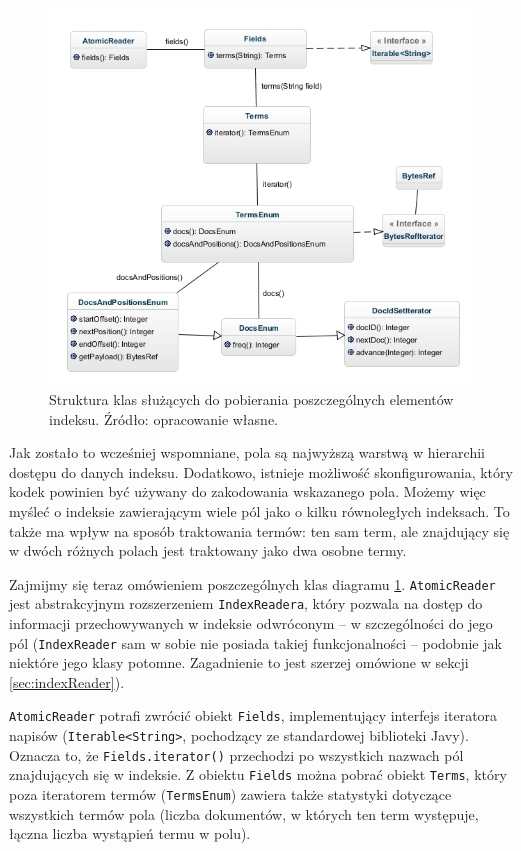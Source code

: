 \begin{figure}[here]
 \includegraphics[scale=0.64]{pictures/LuceneAccessAPI_1.jpg}
 \caption{Struktura klas służących do pobierania poszczególnych elementów indeksu. Źródło: opracowanie własne.\label{fig:indexApi}}
\end{figure}

Jak zostało to wcześniej wspomniane, pola są najwyższą warstwą w hierarchii dostępu do danych indeksu. Dodatkowo, istnieje możliwość skonfigurowania, który kodek powinien być używany do zakodowania wskazanego pola. Możemy więc myśleć o indeksie zawierającym wiele pól jako o kilku równoległych indeksach. To także ma wpływ na sposób traktowania termów: ten sam term, ale znajdujący się w dwóch różnych polach jest traktowany jako dwa osobne termy. 

Zajmijmy się teraz omówieniem poszczególnych klas diagramu \ref{fig:indexApi}. \texttt{AtomicReader} jest abstrakcyjnym rozszerzeniem \texttt{IndexReadera}, który pozwala na dostęp do informacji przechowywanych w indeksie odwróconym -- w szczególności do jego pól (\texttt{IndexReader} sam w sobie nie posiada takiej funkcjonalności -- podobnie jak niektóre jego klasy potomne. Zagadnienie to jest szerzej omówione w sekcji \ref{sec:indexReader}). 

\texttt{AtomicReader} potrafi zwrócić obiekt \texttt{Fields}, implementujący interfejs iteratora napisów (\texttt{Iterable<String>}, pochodzący ze standardowej biblioteki Javy). Oznacza to, że \texttt{Fields.iterator()} przechodzi po wszystkich nazwach pól znajdujących się w indeksie. Z obiektu \texttt{Fields} można pobrać obiekt \texttt{Terms}, który poza iteratorem termów (\texttt{TermsEnum}) zawiera także statystyki dotyczące wszystkich termów pola (liczba dokumentów, w których ten term występuje, łączna liczba wystąpień termu w polu).

